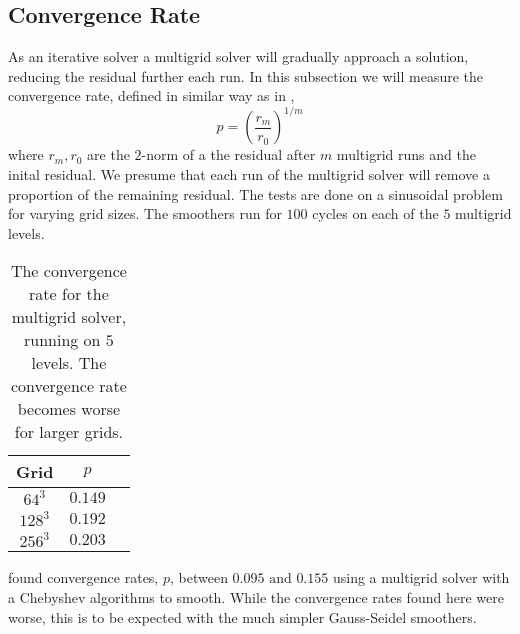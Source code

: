 \subsection{Convergence Rate}
	As an iterative solver a multigrid solver will gradually approach a solution,
	reducing the residual further each run. In this subsection we will measure the convergence
	rate, defined in similar way as in \citet{zhukov_parallel_2014},
	\begin{equation}
		p = \left(\frac{r_m}{r_0}\right)^{1/m}
	\end{equation}
	where \(r_m, r_0\) are the \(2\)-norm of a the residual after \(m\) multigrid runs
 	and the inital residual. We presume that each run of the multigrid solver will
	remove a proportion of the remaining residual.
	The tests are done on a sinusoidal
	problem for varying grid sizes. The smoothers run for \(100\) cycles on each of the \(5\) multigrid levels.
	\begin{table}
	\centering
		\begin{tabular}{c|c|c}
			Grid 		& \(p\)
			\\ \hline
			\(64^3\)	& \(0.149\)
			\\ \hline
			\(128^3\)	& \(0.192\)
			\\ \hline
			\(256^3\)	& \(0.203\)
		\end{tabular}
		\caption{The convergence rate for the multigrid solver, running on \(5\) levels. The convergence rate becomes
		worse for larger grids.}
	\end{table}
	\citet{zhukov_parallel_2014} found convergence rates, \(p\), between  \( 0.095 \text{ and } 0.155\)
	using a multigrid solver with a Chebyshev algorithms to smooth. While the convergence rates found here were
	worse, this is to be expected with the much simpler Gauss-Seidel smoothers.
